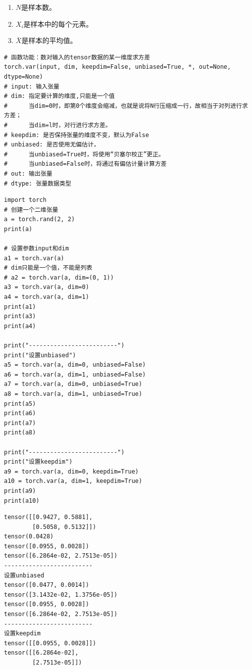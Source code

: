 \begin{enumerate}[label=\arabic*)]
        \item $N$是样本数。

        \item $X_{i}$是样本中的每个元素。
        
        \item $\bar{X}$是样本的平均值。
\end{enumerate}


\begin{lstlisting}[style=demostyle,numbers=none]
# 函数功能：数对输入的tensor数据的某一维度求方差
torch.var(input, dim, keepdim=False, unbiased=True, *, out=None, dtype=None)
# input: 输入张量
# dim: 指定要计算的维度,只能是一个值
#      当dim=0时，即第0个维度会缩减，也就是说将N行压缩成一行，故相当于对列进行求方差；
#      当dim=l时，对行进行求方差。
# keepdim: 是否保持张量的维度不变，默认为False
# unbiased: 是否使用无偏估计，
#      当unbiased=True时，将使用“贝塞尔校正”更正。
#      当unbiased=False时，将通过有偏估计量计算方差
# out: 输出张量
# dtype: 张量数据类型
\end{lstlisting}
\begin{lstlisting}[style=pythonstyle]
import torch
# 创建一个二维张量
a = torch.rand(2, 2)
print(a)

# 设置参数input和dim
a1 = torch.var(a)
# dim只能是一个值，不能是列表
# a2 = torch.var(a, dim=(0, 1)) 
a3 = torch.var(a, dim=0)
a4 = torch.var(a, dim=1)
print(a1)
print(a3)
print(a4)

print("-------------------------")
print("设置unbiased")
a5 = torch.var(a, dim=0, unbiased=False)
a6 = torch.var(a, dim=1, unbiased=False)
a7 = torch.var(a, dim=0, unbiased=True)
a8 = torch.var(a, dim=1, unbiased=True)
print(a5)
print(a6)
print(a7)
print(a8)

print("-------------------------")
print("设置keepdim")
a9 = torch.var(a, dim=0, keepdim=True)
a10 = torch.var(a, dim=1, keepdim=True)
print(a9)
print(a10)
\end{lstlisting}
\begin{lstlisting}[style=demostyle,numbers=none]
tensor([[0.9427, 0.5881],
        [0.5058, 0.5132]])
tensor(0.0428)
tensor([0.0955, 0.0028])
tensor([6.2864e-02, 2.7513e-05])
-------------------------
设置unbiased
tensor([0.0477, 0.0014])
tensor([3.1432e-02, 1.3756e-05])
tensor([0.0955, 0.0028])
tensor([6.2864e-02, 2.7513e-05])
-------------------------
设置keepdim
tensor([[0.0955, 0.0028]])
tensor([[6.2864e-02],
        [2.7513e-05]])
\end{lstlisting}

